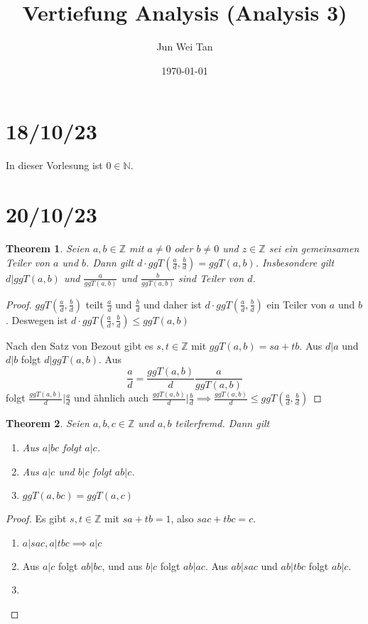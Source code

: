 \documentclass[prb,12pt]{revtex4-2}
\newtheorem{Theorem}{Theorem}
\theoremstyle{definition}
\theoremstyle{definition}
\newenvironment{parts}{\begin{enumerate}[label=(\alph*)]}{\end{enumerate}}
\newcommand{\N}{\mathbb{N}}
\newcommand{\Z}{\mathbb{Z}}
\begin{document}
	\title{Vertiefung Analysis (Analysis 3)}
	\author{Jun Wei Tan}
	\date{\today}
	\maketitle
\section{18/10/23}
In dieser Vorlesung ist $0\in \N$.
\section{20/10/23}
\begin{Theorem}
Seien $a,b\in \Z$ mit $a\neq 0$ oder $b\neq 0$ und $z\in \Z$ sei ein gemeinsamen Teiler von $a$ und $b$. Dann gilt $d\cdot ggT\left( \frac{a}{d},\frac{b}{d} \right) =ggT(a,b)$. Insbesondere gilt $d|ggT(a,b)$ und $\frac{a}{ggT(a,b)}$ und $\frac{b}{ggT(a,b)}$ sind Teiler von $d$.	
\end{Theorem}
\begin{proof}
	$ggT\left( \frac{a}{d},\frac{b}{d} \right) $ teilt $\frac{a}{d}$ und $\frac{b}{d}$ und daher ist $d\cdot ggT\left( \frac{a}{d},\frac{b}{d} \right) $ ein Teiler von $a$ und $b$. Deswegen ist $d\cdot ggT\left( \frac{a}{d},\frac{b}{d} \right) \le ggT(a,b)$

	Nach den Satz von Bezout gibt es $s,t \in \Z$ mit $ggT(a,b)=sa+tb$. Aus $d|a$ und $d|b$ folgt $d|ggT(a,b)$. Aus
	 \[
	\frac{a}{d}=\frac{ggT(a,b)}{d} \frac{a}{ggT(a,b)}
	\]
	folgt $\frac{ggT(a,b)}{d}|\frac{a}{d}$ und ähnlich auch $\frac{ggT(a,b)}{d}|\frac{b}{d}\implies \frac{ggT(a,b)}{d}\le ggT(\frac{a}{d},\frac{b}{d})$
\end{proof}

\begin{Theorem}
	Seien $a,b,c\in\Z$ und $a,b$ teilerfremd. Dann gilt
	\begin{parts}
		\item Aus $a|bc$ folgt $a|c$.
		\item Aus $a|c$ und $b|c$ folgt $ab|c$.
		\item $ggT(a,bc)=ggT(a,c)$
	\end{parts}
\end{Theorem}

\begin{proof}
	Es gibt $s,t\in\Z$ mit $sa+tb=1$, also $sac+tbc=c$.
	\begin{parts}
	\item $a|sac, a|tbc\implies a|c$
	\item Aus  $a|c$ folgt $ab|bc$, und aus $b|c$ folgt $ab|ac$. Aus $ab|sac$ und $ab|tbc$ folgt $ab|c$.
	\item 
	\end{parts}
\end{proof}
\end{document}
